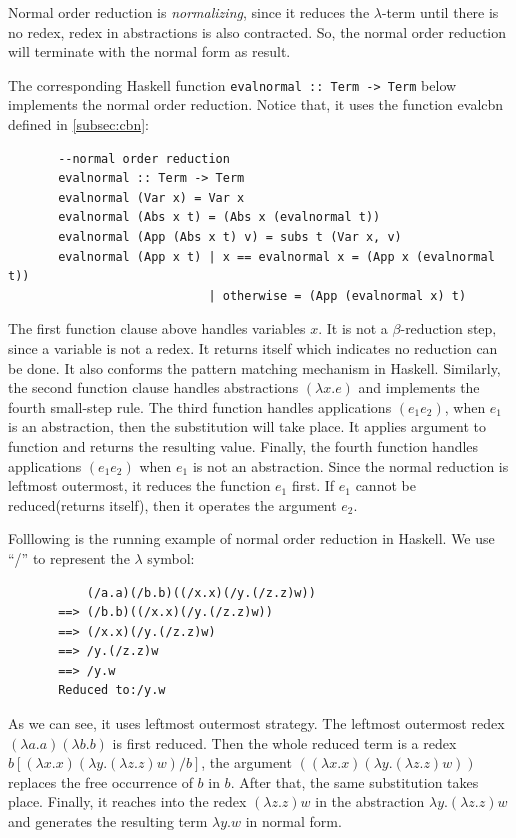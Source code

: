 Normal order reduction is \textit{normalizing}, since it reduces the $\lambda$-term until there is no redex, redex in abstractions is also contracted. So, the normal order reduction will terminate with the normal form as result. 

The corresponding Haskell function \verb|evalnormal :: Term -> Term| below implements the normal order reduction. Notice that, it uses the function evalcbn defined in \ref{subsec:cbn}:

\begin{verbatim}
       --normal order reduction
       evalnormal :: Term -> Term
       evalnormal (Var x) = Var x
       evalnormal (Abs x t) = (Abs x (evalnormal t))
       evalnormal (App (Abs x t) v) = subs t (Var x, v)
       evalnormal (App x t) | x == evalnormal x = (App x (evalnormal t))
                            | otherwise = (App (evalnormal x) t)
\end{verbatim}

The first function clause above handles variables $x$. It is not a $\beta$-reduction step, since a variable is not a redex. It returns itself which indicates no reduction can be done. It also conforms the pattern matching mechanism in Haskell. Similarly, the second function clause handles abstractions $(\lambda x.e)$ and implements the fourth small-step rule. The third function handles applications $(e_1e_2)$, when $e_1$ is an abstraction, then the substitution will take place. It applies argument to function and returns the resulting value. Finally, the fourth function handles applications $(e_1e_2)$ when $e_1$ is not an abstraction. Since the normal reduction is leftmost outermost, it reduces the function $e_1$ first. If $e_1$ cannot be reduced(returns itself), then it operates the argument $e_2$. 

\begin{exmp}
\normalfont Folllowing is the running example of normal order reduction in Haskell. We use ``/'' to represent the $\lambda$ symbol:
\end{exmp}

\begin{verbatim}
           (/a.a)(/b.b)((/x.x)(/y.(/z.z)w))
       ==> (/b.b)((/x.x)(/y.(/z.z)w))
       ==> (/x.x)(/y.(/z.z)w)
       ==> /y.(/z.z)w
       ==> /y.w
       Reduced to:/y.w
\end{verbatim}


As we can see, it uses leftmost outermost strategy. The leftmost outermost redex $(\lambda a.a)(\lambda b.b)$ is first reduced. Then the whole reduced term is a redex $b[(\lambda x.x)(\lambda y.(\lambda z.z)w)/b]$, the argument $((\lambda x.x)(\lambda y.(\lambda z.z)w))$ replaces the free occurrence of $b$ in $b$. After that, the same substitution takes place. Finally, it reaches into the redex $(\lambda z.z)w$ in the abstraction $\lambda y.(\lambda z.z)w$ and generates the resulting term $\lambda y.w$ in normal form.


